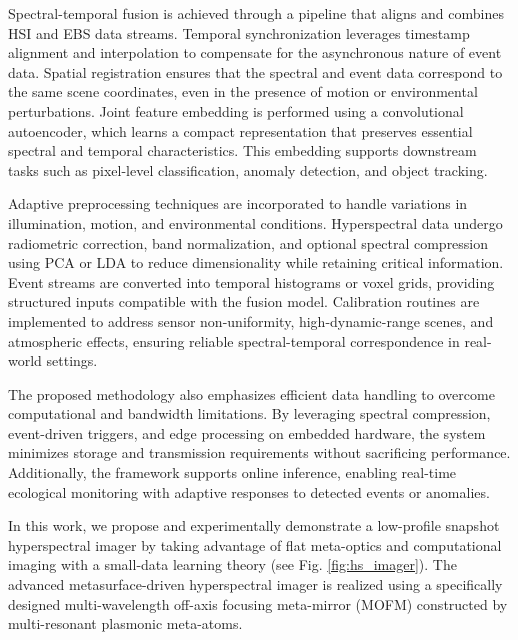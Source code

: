 \documentclass[conference]{IEEEtran}
\begin{document}
Spectral-temporal fusion is achieved through a pipeline that aligns and combines HSI and EBS data streams. Temporal synchronization leverages timestamp alignment and interpolation to compensate for the asynchronous nature of event data. Spatial registration ensures that the spectral and event data correspond to the same scene coordinates, even in the presence of motion or environmental perturbations. Joint feature embedding is performed using a convolutional autoencoder, which learns a compact representation that preserves essential spectral and temporal characteristics. This embedding supports downstream tasks such as pixel-level classification, anomaly detection, and object tracking.

Adaptive preprocessing techniques are incorporated to handle variations in illumination, motion, and environmental conditions. Hyperspectral data undergo radiometric correction, band normalization, and optional spectral compression using PCA or LDA to reduce dimensionality while retaining critical information. Event streams are converted into temporal histograms or voxel grids, providing structured inputs compatible with the fusion model. Calibration routines are implemented to address sensor non-uniformity, high-dynamic-range scenes, and atmospheric effects, ensuring reliable spectral-temporal correspondence in real-world settings.

The proposed methodology also emphasizes efficient data handling to overcome computational and bandwidth limitations. By leveraging spectral compression, event-driven triggers, and edge processing on embedded hardware, the system minimizes storage and transmission requirements without sacrificing performance. Additionally, the framework supports online inference, enabling real-time ecological monitoring with adaptive responses to detected events or anomalies.

In this work, we propose and experimentally demonstrate a low-profile snapshot hyperspectral imager by taking advantage of flat meta-optics and computational imaging with a small-data learning theory (see Fig. \ref{fig:hs_imager}). The advanced metasurface-driven hyperspectral imager is realized using a specifically designed multi-wavelength off-axis focusing meta-mirror (MOFM) constructed by multi-resonant plasmonic meta-atoms.
\end{document}
